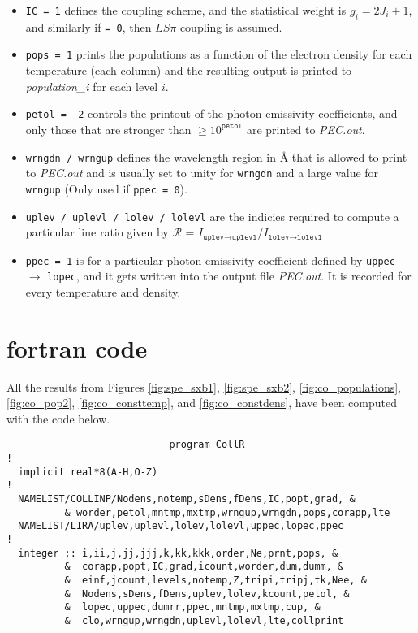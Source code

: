 \begin{appendices}
\begin{itemize}
\item{\texttt{IC = 1} defines the coupling scheme, and the statistical weight is $g_i = 2J_i+1$, and similarly if \texttt{= 0}, then $LS\pi$ coupling is assumed.}

\item{\texttt{pops = 1} prints the populations as a function of the electron density for each temperature (each column) and the resulting output is printed to \textit{population\_i} for each level $i$.}

\item{\texttt{petol = -2} controls the printout of the photon emissivity coefficients, and only those that are stronger than $\geq 10^{\texttt{petol}}$ are printed to \textit{PEC.out}.}

\item{\texttt{wrngdn / wrngup} defines the wavelength region in {\rm \AA} that is allowed to print to \textit{PEC.out} and is usually set to unity for \texttt{wrngdn} and a large value for \texttt{wrngup} (Only used if \texttt{ppec = 0}).}

\item{\texttt{uplev / uplevl / lolev / lolevl} are the indicies required to compute a particular line ratio given by $\mathcal{R}$ = $I_{\texttt{uplev}\rightarrow\texttt{uplevl}}$/$I_{\texttt{lolev}\rightarrow\texttt{lolevl}}$ }

\item{\texttt{ppec = 1} is for a particular photon emissivity coefficient defined by \texttt{uppec} $\rightarrow$ \texttt{lopec}, and it gets written into the output file \textit{PEC.out}. It is recorded for every temperature and density.}

\end{itemize}



\section*{{\sc fortran} code}
All the results from Figures \ref{fig:spe_sxb1}, \ref{fig:spe_sxb2}, \ref{fig:co_populations}, \ref{fig:co_pop2}, \ref{fig:co_consttemp}, and \ref{fig:co_constdens}, have been computed with the code below.

\begin{verbatim}
                            program CollR
!
  implicit real*8(A-H,O-Z)
!
  NAMELIST/COLLINP/Nodens,notemp,sDens,fDens,IC,popt,grad, &
          & worder,petol,mntmp,mxtmp,wrngup,wrngdn,pops,corapp,lte
  NAMELIST/LIRA/uplev,uplevl,lolev,lolevl,uppec,lopec,ppec
!
  integer :: i,ii,j,jj,jjj,k,kk,kkk,order,Ne,prnt,pops, &
          &  corapp,popt,IC,grad,icount,worder,dum,dumm, &
          &  einf,jcount,levels,notemp,Z,tripi,tripj,tk,Nee, &
          &  Nodens,sDens,fDens,uplev,lolev,kcount,petol, &
          &  lopec,uppec,dumrr,ppec,mntmp,mxtmp,cup, &
          &  clo,wrngup,wrngdn,uplevl,lolevl,lte,collprint


\end{verbatim}
\end{appendices}
